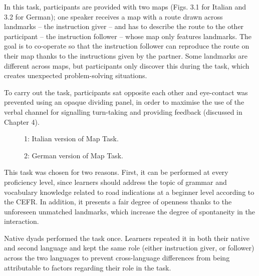 In this task, participants are provided with two maps (Figs. 3.1 for Italian and 3.2 for German); one speaker receives a map with a route drawn across landmarks – the instruction giver – and has to describe the route to the other participant – the instruction follower – whose map only features landmarks. The goal is to co-operate so that the instruction follower can reproduce the route on their map thanks to the instructions given by the partner. Some landmarks are different across maps, but participants only discover this during the task, which creates unexpected problem-solving situations. 

To carry out the task, participants sat opposite each other and eye-contact was prevented using an opaque dividing panel, in order to maximise the use of the verbal channel for signalling turn-taking and providing feedback (discussed in Chapter 4). 

  
 

\begin{stylecaption}\begin{figure}
\caption{1: Italian version of Map Task.}
\label{fig:key:3}
\end{figure}\end{stylecaption}

  
 

\begin{stylecaption}\begin{figure}
\caption{2: German version of Map Task.}
\label{fig:key:3}
\end{figure}\end{stylecaption}

This task was chosen for two reasons. First, it can be performed at every proficiency level, since learners should address the topic of grammar and vocabulary knowledge related to road indications at a beginner level according to the CEFR. In addition, it presents a fair degree of openness thanks to the unforeseen unmatched landmarks, which increase the degree of spontaneity in the interaction.

Native dyads performed the task once. Learners repeated it in both their native and second language and kept the same role (either instruction giver, or follower) across the two languages to prevent cross-language differences from being attributable to factors regarding their role in the task.

